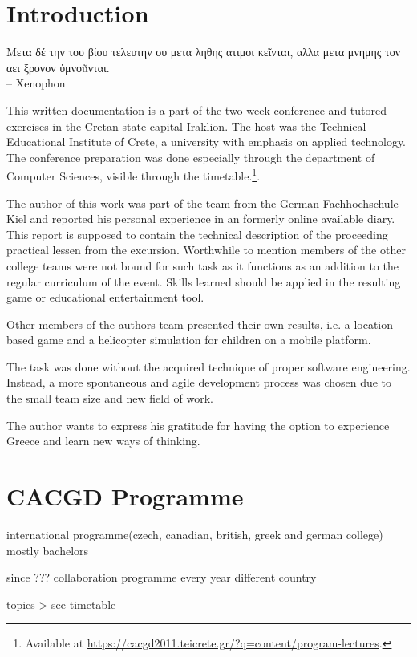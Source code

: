 \documentclass[bibtotocnumbered, headsepline,normalheadings,12pt]{report}
\newcommand{\gdir}%
   {\foreignlanguage{polutonikogreek}}
\begin{document}
\chapter{Introduction}
\label{chap:intro}
\gdir{Μετα δέ την του βίου τελευτην ου  μετα ληθης ατιμοι κεῖνται, αλλα μετα μνημης τον αει ξρονον ὑμνοũνται.}\\
-- Xenophon
\vspace{15mm}

This written documentation is a part of the two week conference and tutored exercises in the Cretan state capital Iraklion. The host was the
Technical Educational Institute of Crete, a university with emphasis on applied technology. The conference preparation was done especially through the 
department of Computer Sciences, visible through the timetable.\footnote{Available at \url{https://cacgd2011.teicrete.gr/?q=content/program-lectures}.}.

The author of this work was part of the team from the German Fachhochschule Kiel and reported his personal experience in an formerly online available
diary. This report is supposed to contain the technical description of the proceeding practical lessen from the excursion. Worthwhile to mention 
members of the other college teams were not bound for such task as it functions as an addition to the regular curriculum of the event.
Skills learned should be applied in the resulting game or educational entertainment tool.

Other members of the authors team presented their own results, i.e. a location-based game and a helicopter simulation for children on a mobile platform.

The task was done without the acquired technique of proper software engineering. Instead, a more spontaneous and agile development process was
chosen due to the small team size and new field of work.

The author wants to express his gratitude for having the option to experience Greece and learn new ways of thinking. 


\chapter{CACGD Programme}
\label{chap:cacgd}

international programme(czech, canadian, british, greek and german college)
mostly bachelors

since ???
collaboration programme
every year different country

topics-> see timetable
\end{document}
